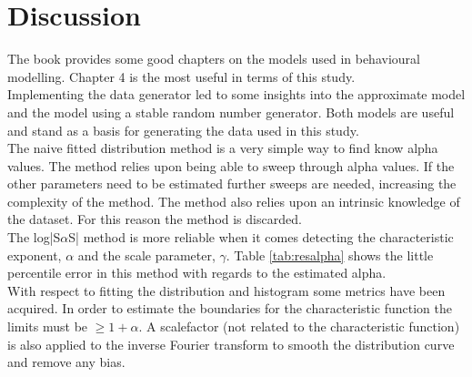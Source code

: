 \chapter{Discussion}
The book\cite{viswanathan2011the} provides some good chapters on the models used in behavioural modelling. Chapter 4 is the most useful in terms of this study.\\
Implementing the data generator led to some insights into the approximate model and the model using a stable random number generator. 
Both models are useful and stand as a basis for generating the data used in this study.\\
The naive fitted distribution method is a very simple way to find know alpha values. 
The method relies upon being able to sweep through alpha values. 
If the other parameters need to be estimated further sweeps are needed, increasing the complexity of the method. 
The method also relies upon an intrinsic knowledge of the dataset. 
For this reason the method is discarded.\\
The log|S$\alpha$S| method is more reliable when it comes detecting the characteristic exponent, $\alpha$ and the scale parameter, $\gamma$. Table \ref{tab:resalpha} shows the little percentile error in this method with regards to the estimated alpha.\\
With respect to fitting the distribution and histogram some metrics have been acquired. 
In order to estimate the boundaries for the characteristic function the limits must be  $\geq 1 + \alpha$. 
A scalefactor (not related to the characteristic function) is also applied to the inverse Fourier transform to smooth the distribution curve and remove any bias.\\

